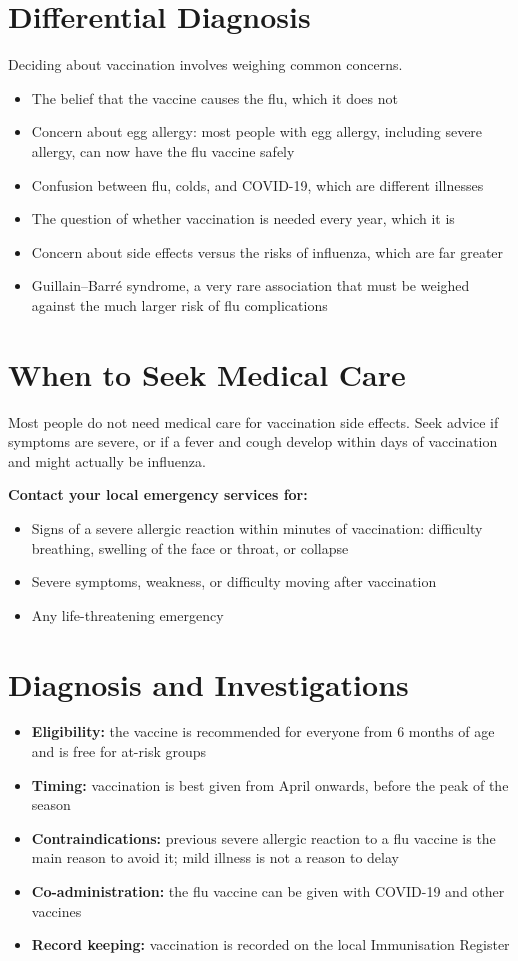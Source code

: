 \section*{Differential Diagnosis}
Deciding about vaccination involves weighing common concerns.
\begin{itemize}
    \item The belief that the vaccine causes the flu, which it does not
    \item Concern about egg allergy: most people with egg allergy, including severe allergy, can now have the flu vaccine safely
    \item Confusion between flu, colds, and COVID-19, which are different illnesses
    \item The question of whether vaccination is needed every year, which it is
    \item Concern about side effects versus the risks of influenza, which are far greater
    \item Guillain--Barré syndrome, a very rare association that must be weighed against the much larger risk of flu complications
\end{itemize}

\section*{When to Seek Medical Care}
Most people do not need medical care for vaccination side effects. Seek advice if symptoms are severe, or if a fever and cough develop within days of vaccination and might actually be influenza.

\textbf{Contact your local emergency services for:}
\begin{itemize}
    \item Signs of a severe allergic reaction within minutes of vaccination: difficulty breathing, swelling of the face or throat, or collapse
    \item Severe symptoms, weakness, or difficulty moving after vaccination
    \item Any life-threatening emergency
\end{itemize}

\section*{Diagnosis and Investigations}
\begin{itemize}
    \item \textbf{Eligibility:} the vaccine is recommended for everyone from 6 months of age and is free for at-risk groups
    \item \textbf{Timing:} vaccination is best given from April onwards, before the peak of the season
    \item \textbf{Contraindications:} previous severe allergic reaction to a flu vaccine is the main reason to avoid it; mild illness is not a reason to delay
    \item \textbf{Co-administration:} the flu vaccine can be given with COVID-19 and other vaccines
    \item \textbf{Record keeping:} vaccination is recorded on the local Immunisation Register
\end{itemize}

